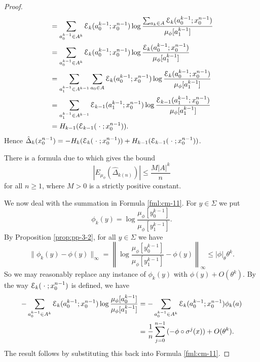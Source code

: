 \begin{lemma}
\begin{proof}
\begin{align*}
				&= \sum_{a_0^{k - 1} \in A^k}\mathcal{E}_k(a_0^{k - 1}; x_0^{n - 1}) \log{\frac{\sum_{a_{k} \in A}{\mathcal{E}_k(a_0^{k - 1}; x_0^{n - 1})}}{\mu_\phi[a_1^{k - 1}]}} \\
				&= \sum_{a_0^{k - 1} \in A^k}\mathcal{E}_k(a_0^{k - 1}; x_0^{n - 1}) \log{\frac{\mathcal{E}_k(a_0^{k - 1}; x_0^{n - 1})}{\mu_\phi[a_1^{k - 1}]}} \\
				&= \sum_{a_1^{k - 1} \in A^{k - 1}}\sum_{a_0 \in A}\mathcal{E}_k(a_0^{k - 1}; x_0^{n - 1}) \log{\frac{\mathcal{E}_k(a_0^{k - 1}; x_0^{n - 1})}{\mu_\phi[a_1^{k - 1}]}} \\
				&= \sum_{a_1^{k - 1} \in A^{k - 1}}\mathcal{E}_{k - 1}(a_1^{k - 1}; x_0^{n - 1}) \log{\frac{\mathcal{E}_{k - 1}(a_1^{k - 1}; x_0^{n - 1})}{\mu_\phi[a_1^{k - 1}]}} \\
				&= H_{k - 1}(\mathcal{E}_{k - 1}(\mathrel{}\cdot\mathrel{}; x_0^{n - 1})).
		\end{align*}
		Hence $\hat{\Delta}_k(x_0^{n - 1}) = -H_k(\mathcal{E}_k(\mathrel{}\cdot\mathrel{}; x_0^{n - 1})) + H_{k - 1}(\mathcal{E}_{k - 1}(\mathrel{}\cdot\mathrel{}; x_0^{n - 1}))$.
		
		There is a formula due to \cite[Formulae (4.15), (4.16)]{gabrielli-galves-guiol:fluctuations} which gives the bound
		\[
			|E_{\mu_\phi}(\hat{\Delta}_{k(n)})| \leq \frac{M|A|^k}{n}
		\]
		for all $n \geq 1$, where $M > 0$ is a strictly positive constant.
		
		We now deal with the summation in Formula \eqref{fml:cm-11}. For $y \in \Sigma$ we put
		\[
			\phi_k(y) = \log\frac{\mu_\phi[y_0^{k - 1}]}{\mu_\phi[y_1^{k - 1}]}.
		\]
		By Proposition \ref{prop:pp-3-2}, for all $y \in \Sigma$ we have
		\[
			\|\phi_k(y) - \phi(y)\|_\infty = \left\|\log\frac{\mu_\phi[y_0^{k - 1}]}{\mu_\phi[y_1^{k - 1}]} - \phi(y)\right\|_\infty \leq |\phi|_\theta \theta^k.
		\]
		So we may reasonably replace any instance of $\phi_k(y)$ with $\phi(y) + O(\theta^k)$. By the way $\mathcal{E}_k(\mathrel{}\cdot\mathrel{}; x_0^{n - 1})$ is defined, we have
		\begin{align*}
			-\sum_{a_0^{k - 1} \in A^k}\mathcal{E}_k(a_0^{k - 1}; x_0^{n - 1}) \log{\frac{\mu_\phi[a_0^{k - 1}]}{\mu_\phi[a_1^{k - 1}]}} &= -\sum_{a_0^{k - 1} \in A^k}\mathcal{E}_k(a_0^{k - 1}; x_0^{n - 1}) \phi_k(a) \\
				&= \frac{1}{n}\sum_{j = 0}^{n - 1}{(-\phi \circ \sigma^j(x))} + O(\theta^k).
		\end{align*}
		The result follows by substituting this back into Formula \eqref{fml:cm-11}.
	\end{proof}
\end{lemma}
